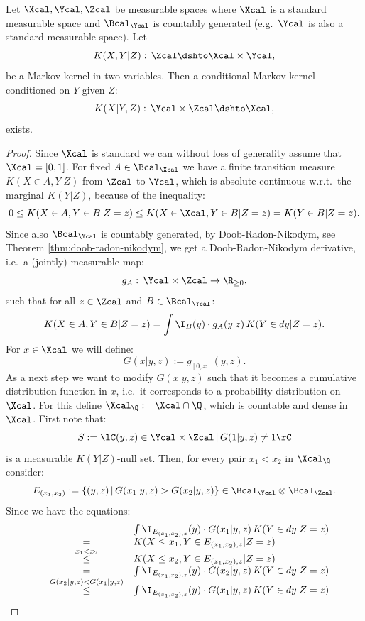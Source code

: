 \begin{Thm}
    \label{reg-cond-trans-kernel-existence-I}
    Let $\Xcal, \Ycal, \Zcal$ be measurable spaces where $\Xcal$ is a standard measurable space and $\Bcal_\Ycal$ is countably generated (e.g.\ $\Ycal$ is also a standard measurable space).
Let 
\[ K(X,Y|Z): \, \Zcal \dshto  \Xcal \times \Ycal,\]
be a Markov kernel in two variables. 
Then a conditional Markov kernel
conditioned on $Y$ given $Z$:
\[ K(X|Y,Z): \, \Ycal \times \Zcal \dshto  \Xcal,\]
exists.
\begin{proof}
    Since $\Xcal$ is standard we can without loss of generality assume that $\Xcal=[0,1]$.
    For fixed $A \in \Bcal_\Xcal$
    we have a finite transition measure $ K(X\in A, Y|Z)$ from $\Zcal$ to $\Ycal$, which is 
    absolute continuous w.r.t.\ the marginal $ K(Y|Z)$, because of the inequality:
    \[ 0 \le  K(X\in A, Y \in B |Z=z) \le K(X\in \Xcal, Y \in B |Z=z) = K(Y \in B |Z=z).   \]
    Since also $\Bcal_\Ycal$ is countably generated, by Doob-Radon-Nikodym, see Theorem \ref{thm:doob-radon-nikodym},
    we get a Doob-Radon-Nikodym derivative, i.e.\ a (jointly) measurable map:
    \[g_A:\, \Ycal \times \Zcal \to \R_{\ge 0},\]
    such that for all $z \in \Zcal$ and $B \in \Bcal_\Ycal$:
    \[  K(X \in A, Y \in B|Z=z) = \int \I_B(y) \cdot g_A(y|z)\,  K(Y \in dy|Z=z).\]
    For $x \in \Xcal$ we will define:
    \[ G(x|y,z) := g_{[0,x]}(y,z).\] 
As a next step we want to modify  $G(x|y,z)$ such that it becomes a cumulative distribution function in $x$, i.e.\ it corresponds to a probability distribution on $\Xcal$. 
For this define $\Xcal_\Q:= \Xcal \cap \Q$, which is countable and dense in $\Xcal$.
First note that:
\[ S:=\lC (y,z) \in \Ycal \times \Zcal \,|\, G(1|y,z) \neq 1 \rC  \]
is a measurable $ K(Y|Z)$-null set.
Then, for every pair $x_1<x_2$ in $\Xcal_\Q$ consider:
\[ E_{(x_1,x_2)} := \{ (y,z) \,|\, G(x_1|y,z) > G(x_2|y,z) \} \in \Bcal_\Ycal \otimes \Bcal_\Zcal. \]
Since we have the equations:
\[ \begin{array}{rcl}
 &&\int \I_{E_{(x_1,x_2),z}}(y) \cdot G(x_1|y,z) \,  K(Y \in dy|Z=z) \\
&=&  K(X \le x_1, Y \in E_{(x_1,x_2),z} |Z=z) \\
&\stackrel{x_1 < x_2}{\le}&  K(X \le x_2, Y \in E_{(x_1,x_2),z} |Z=z)  \\
&=& \int \I_{E_{(x_1,x_2),z}}(y) \cdot G(x_2|y,z) \,  K(Y \in dy|Z=z) \\
&\stackrel{G(x_2|y,z) < G(x_1|y,z)}{\le} & \int \I_{E_{(x_1,x_2),z}}(y) \cdot G(x_1|y,z) \,  K(Y \in dy|Z=z)

\end{array}\]
\end{proof}
\end{Thm}

